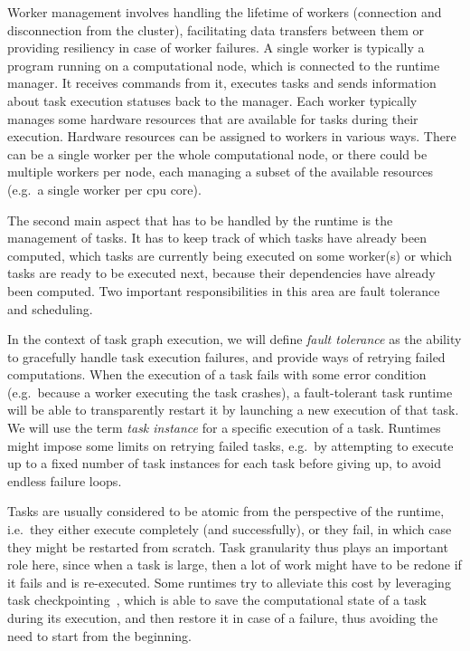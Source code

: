 Worker management involves handling the lifetime of workers (connection and disconnection from the
cluster), facilitating data transfers between them or providing resiliency in case of worker
failures. A single worker is typically a program running on a computational node, which is
connected to the runtime manager. It receives commands from it, executes tasks and sends
information about task execution statuses back to the manager. Each worker typically manages some
hardware resources that are available for tasks during their execution. Hardware resources can be
assigned to workers in various ways. There can be a single worker per the whole computational node,
or there could be multiple workers per node, each managing a subset of the available resources
(e.g.\ a single worker per \gls{cpu} core).

The second main aspect that has to be handled by the runtime is the management of tasks. It has to
keep track of which tasks have already been computed, which tasks are currently being executed on
some worker(s) or which tasks are ready to be executed next, because their dependencies have
already been computed. Two important responsibilities in this area are fault tolerance and
scheduling.

In the context of task graph execution, we will define \emph{fault tolerance} as the ability to
gracefully handle task execution failures, and provide ways of retrying failed computations. When
the execution of a task fails with some error condition (e.g.\ because a worker executing the task
crashes), a fault-tolerant task runtime will be able to transparently restart it by launching a new
execution of that task. We will use the term \emph{task instance} for a specific execution of a
task. Runtimes might impose some limits on retrying failed tasks, e.g.\ by attempting to execute up
to a fixed number of task instances for each task before giving up, to avoid endless failure loops.

Tasks are usually considered to be atomic from the perspective of the runtime, i.e.\ they either
execute completely (and successfully), or they fail, in which case they might be restarted from
scratch. Task granularity thus plays an important role here, since when a task is large, then a lot
of work might have to be redone if it fails and is re-executed. Some runtimes try to alleviate this
cost by leveraging task checkpointing~\cite{task_checkpointing}, which is able to save the
computational state of a task during its execution, and then restore it in case of a failure, thus
avoiding the need to start from the beginning.

